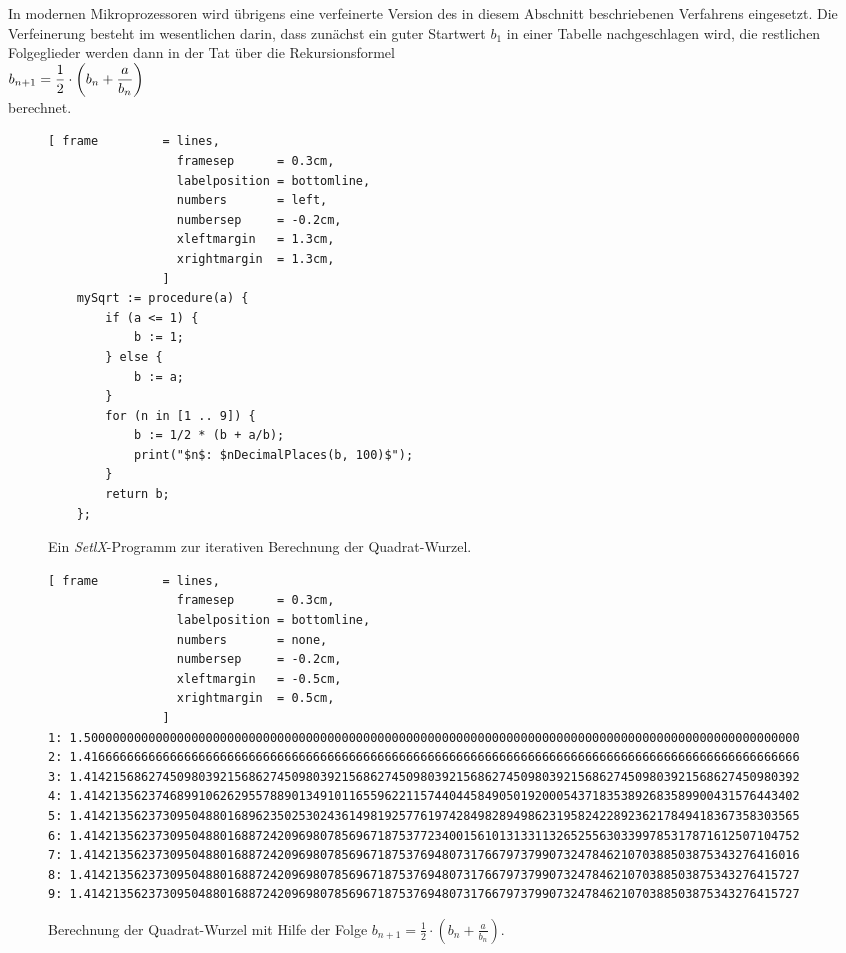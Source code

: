 In modernen Mikroprozessoren wird \"ubrigens eine verfeinerte Version des in diesem
Abschnitt beschriebenen Verfahrens eingesetzt.  Die Verfeinerung besteht im wesentlichen
darin, dass zun\"achst ein guter Startwert $b_1$ in einer Tabelle nachgeschlagen wird, die
restlichen Folgeglieder werden dann in der Tat \"uber die Rekursionsformel 
\\[0.2cm]
\hspace*{1.3cm}
      $\displaystyle b_{n+1} = \frac{1}{2}\cdot  \left(b_n + \frac{a}{b_n}\right)$
\\[0.2cm]
berechnet.

\begin{figure}[!ht]
  \centering
\begin{Verbatim}[ frame         = lines, 
                  framesep      = 0.3cm, 
                  labelposition = bottomline,
                  numbers       = left,
                  numbersep     = -0.2cm,
                  xleftmargin   = 1.3cm,
                  xrightmargin  = 1.3cm,
                ]
    mySqrt := procedure(a) {
        if (a <= 1) {
            b := 1; 
        } else {
            b := a; 
        }     
        for (n in [1 .. 9]) {
            b := 1/2 * (b + a/b);
            print("$n$: $nDecimalPlaces(b, 100)$");
        }
        return b;
    };
\end{Verbatim}
\vspace*{-0.3cm}
  \caption{Ein \textsl{SetlX}-Programm zur iterativen Berechnung der Quadrat-Wurzel.}
  \label{fig:sqrt.stlx}
\end{figure} %

\begin{figure}[!ht]
  \centering
{\footnotesize
\begin{Verbatim}[ frame         = lines, 
                  framesep      = 0.3cm, 
                  labelposition = bottomline,
                  numbers       = none,
                  numbersep     = -0.2cm,
                  xleftmargin   = -0.5cm,
                  xrightmargin  = 0.5cm,
                ]
1: 1.5000000000000000000000000000000000000000000000000000000000000000000000000000000000000000000000000000
2: 1.4166666666666666666666666666666666666666666666666666666666666666666666666666666666666666666666666666
3: 1.4142156862745098039215686274509803921568627450980392156862745098039215686274509803921568627450980392
4: 1.4142135623746899106262955788901349101165596221157440445849050192000543718353892683589900431576443402
5: 1.4142135623730950488016896235025302436149819257761974284982894986231958242289236217849418367358303565
6: 1.4142135623730950488016887242096980785696718753772340015610131331132652556303399785317871612507104752
7: 1.4142135623730950488016887242096980785696718753769480731766797379907324784621070388503875343276416016
8: 1.4142135623730950488016887242096980785696718753769480731766797379907324784621070388503875343276415727
9: 1.4142135623730950488016887242096980785696718753769480731766797379907324784621070388503875343276415727
\end{Verbatim}
}
\vspace*{-0.3cm}
  \caption{Berechnung der Quadrat-Wurzel mit Hilfe der Folge $b_{n+1} = \frac{1}{2}\cdot(b_n + \frac{a}{b_n})$.}
  \label{fig:sqrt-output}
\end{figure}


